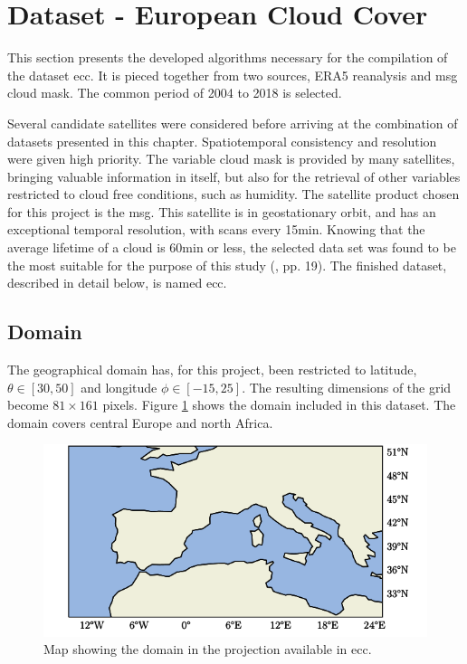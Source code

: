 \section{Dataset - European Cloud Cover }
This section presents the developed algorithms necessary for the compilation of the dataset \acrfull{ecc}. It is pieced together from two sources, ERA5 reanalysis and \acrlong{msg} cloud mask. The common period of 2004 to 2018 is selected.

Several candidate satellites were considered before arriving at the combination of datasets presented in this chapter. Spatiotemporal consistency and resolution were given high priority. The variable cloud mask is provided by many satellites, bringing valuable information in itself, but also for the retrieval of other variables restricted to cloud free conditions, such as humidity. The satellite product chosen for this project is the \acrfull{msg}. This satellite is in geostationary orbit, and has an exceptional temporal resolution, with scans every 15min. Knowing that the average lifetime of a cloud is 60min or less, the selected data set was found to be the most suitable for the purpose of this study (\cite{lohmann2016}, pp. 19). The finished dataset, described in detail below, is named \acrfull{ecc}. 

\subsection{Domain}
The geographical domain has, for this project, been restricted to latitude, $\theta \in[30,50]$ and longitude $\phi \in [-15, 25]$. The resulting dimensions of the grid become $81\times161$ pixels. Figure \ref{fig:map} shows the domain included in this dataset. The domain covers central Europe and north Africa.
\begin{figure}[h]
    \centering
    \includegraphics[scale = 1.0]{python_figs/Domain.png}
    \caption[Map over domain.]{Map showing the domain in the projection available in \acrshort{ecc}.}
    \label{fig:map}
\end{figure}

